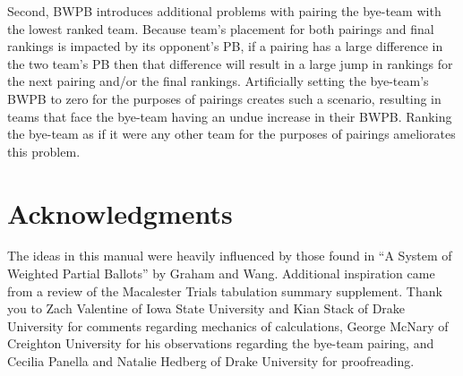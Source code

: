 \documentclass{article}
\begin{document}
Second, BWPB introduces additional problems with pairing the bye-team with the lowest ranked team. Because team's placement for both pairings and final rankings is impacted by its opponent's PB, if a pairing has a large difference in the two team's PB then that difference will result in a large jump in rankings for the next pairing and/or the final rankings. Artificially setting the bye-team's BWPB to zero for the purposes of pairings creates such a scenario, resulting in teams that face the bye-team having an undue increase in their BWPB. Ranking the bye-team as if it were any other team for the purposes of pairings ameliorates this problem.
\section{Acknowledgments}
The ideas in this manual were heavily influenced by those found in ``A System of Weighted Partial Ballots'' by Graham and Wang.  Additional inspiration came from a review of the Macalester Trials tabulation summary supplement.  Thank you to Zach Valentine of Iowa State University and Kian Stack of Drake University for comments regarding mechanics of calculations, George McNary of Creighton University for his observations regarding the bye-team pairing, and Cecilia Panella and Natalie Hedberg of Drake University for proofreading.
\end{document}
